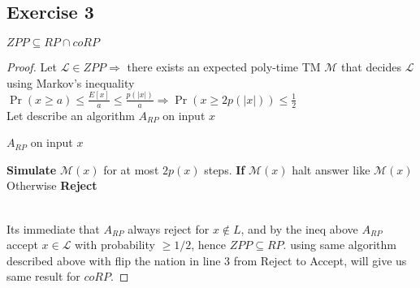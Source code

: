 \documentclass[12pt]{article}
\begin{document}
\subsection{ Exercise 3}
$ZPP\subseteq RP\cap coRP$\\
\begin{proof}
Let $\mathcal{L}\in ZPP \Rightarrow$  there exists an expected poly-time TM $\mathcal{M}$ that decides $\mathcal{L}$ 
\\using Markov's inequality $\Pr (x\ge a  )\le \frac{E[x]}{a}\le \frac{p(|x|)}{a}\Rightarrow \Pr(x\ge 2p(|x|))\le \frac{1}{2} $\\
Let describe an algorithm $A_{RP}$ on input $x$
\begin{algorithm}
\caption{  $A_{RP}$ on input $x$}\label{alg:cap}
\begin{algorithmic}
\State \textbf{Simulate} $\mathcal{M}(x)$ for at most $2p(x)$ steps.
\State \textbf{If}  $\mathcal{M}(x)$ halt answer like $\mathcal{M}(x)$
\State Otherwise \textbf{Reject}
\end{algorithmic}
\end{algorithm}\\
Its immediate that $A_{RP}$ always reject for $x\notin L$, and by the ineq above $A_{RP}$ accept $x\in \mathcal{L}$ with probability $\ge 1/2$, hence $ZPP\subseteq RP$.
using same algorithm described above with flip the nation in line 3 from Reject to Accept, will give us same result for $coRP$.
\end{proof}
\end{document}
